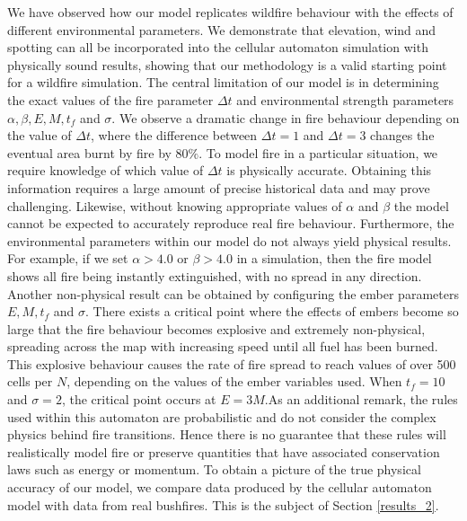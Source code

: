 We have observed how our model replicates wildfire behaviour with the effects of different environmental parameters. We demonstrate that elevation, wind and spotting can all be incorporated into the cellular automaton simulation with physically sound results, showing that our methodology is a valid starting point for a wildfire simulation. \newline \indent The central limitation of our model is in determining the exact values of the fire parameter $\Delta t$ and environmental strength parameters $\alpha, \beta, E,M,t_f$ and $\sigma$. We observe a dramatic change in fire behaviour depending on the value of $\Delta t$, where the difference between $\Delta t=1$ and $\Delta t=3$ changes the eventual area burnt by fire by $80\%$. To model fire in a particular situation, we require knowledge of which value of $\Delta t$ is physically accurate. Obtaining this information requires a large amount of precise historical data and may prove challenging. Likewise, without knowing appropriate values of $\alpha$ and $\beta$ the model cannot be expected to accurately reproduce real fire behaviour. \newline \indent Furthermore, the environmental parameters within our model do not always yield physical results. For example, if we set $\alpha>4.0$ or $\beta>4.0$ in a simulation, then the fire model shows all fire being instantly extinguished, with no spread in any direction. Another non-physical result can be obtained by configuring the ember parameters $E,M,t_f$ and $\sigma$. There exists a critical point where the effects of embers become so large that the fire behaviour becomes explosive and extremely non-physical, spreading across the map with increasing speed until all fuel has been burned. This explosive behaviour causes the rate of fire spread to reach values of over 500 cells per $N$, depending on the values of the ember variables used. When $t_f=10$ and $\sigma=2$, the critical point occurs at $E=3M$.\newline \indent As an additional remark, the rules used within this automaton are probabilistic and do not consider the complex physics behind fire transitions. Hence there is no guarantee that these rules will realistically model fire or preserve quantities that have associated conservation laws such as energy or momentum. To obtain a picture of the true physical accuracy of our model, we compare data produced by the cellular automaton model with data from real bushfires. This is the subject of Section \ref{results_2}.